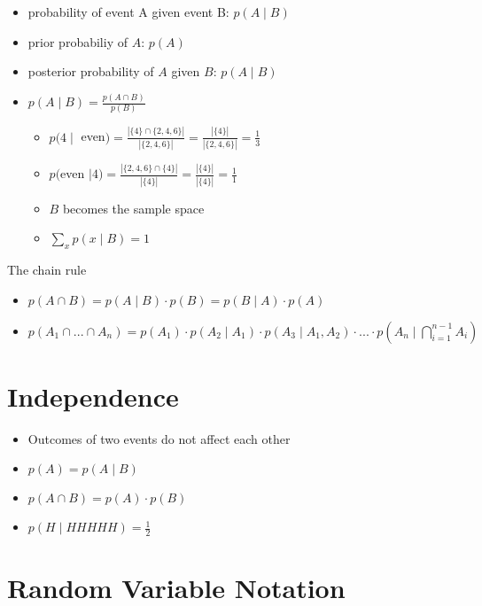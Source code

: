 \documentclass[11pt,letterpaper]{article}
\begin{document}
\begin{itemize}
  \item probability of event A given event B: $p(A \mid B)$
  \item prior probabiliy of $A$: $p(A)$
  \item posterior probability of $A$ given $B$: $p(A \mid B)$
  \item $p(A \mid B) = \frac{p(A \cap B)}{p(B)}$
  \begin{itemize}
    \item $p({4} \mid $ even$) = \frac{|\{4\} \cap \{2,4,6\}|}{|\{2,4,6\}|} = \frac{|\{4\}|}{|\{2,4,6\}|} = \frac{1}{3}$
    \item $p($even $ \mid {4}) = \frac{|\{2,4,6\} \cap \{4\}|}{|\{4\}|} = \frac{|\{4\}|}{|\{4\}|} = \frac{1}{1}$
    \item $B$ becomes the sample space
    \item $\sum_x p(x \mid B) = 1$
  \end{itemize}
\end{itemize}

The chain rule

\begin{itemize}
  \item $p(A \cap B) = p(A \mid B) \cdot p(B) = p(B \mid A) \cdot p(A)$
  \item $p(A_1 \cap ... \cap A_n) = p(A_1) \cdot p(A_2 \mid A_1) \cdot p(A_3 \mid A_1, A_2) \cdot ... \cdot p(A_n \mid \bigcap_{i=1}^{n-1} A_i)$
\end{itemize}

\section{Independence}

\begin{itemize}
  \item Outcomes of two events do not affect each other
  \item $p(A) = p(A \mid B)$
  \item $p(A \cap B) = p(A) \cdot p(B)$
  \item $p(H \mid HHHHH) = \frac{1}{2}$
\end{itemize}


\section{Random Variable Notation}
\end{document}
